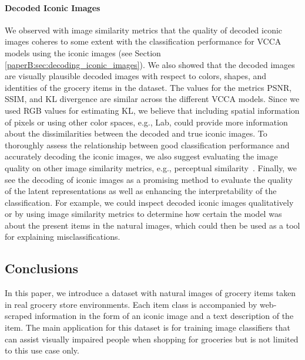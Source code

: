 \vspace{-3mm}
\paragraph{Decoded Iconic Images} %
We observed with image similarity metrics that the quality of decoded iconic images coheres to some extent with the classification performance for VCCA models using the iconic images (see Section \ref{paperB:sec:decoding_iconic_images}). %
We also showed that the decoded images are visually plausible decoded images with respect to colors, shapes, and identities of the grocery items in the dataset. The values for the metrics PSNR, SSIM, and KL divergence are similar across the different VCCA models. Since we used RGB values for estimating KL, we believe that including spatial information of pixels or using other color spaces, e.g., Lab, could provide more information about the dissimilarities between the decoded and true iconic images. To thoroughly assess the relationship between good classification performance and accurately decoding the iconic images, we also suggest evaluating the image quality on other image similarity metrics, e.g., perceptual similarity~. Finally, we see the decoding of iconic images as a promising method to evaluate the quality of the latent representations as well as enhancing the interpretability of the classification. For example, we could inspect decoded iconic images qualitatively or by using image similarity metrics to determine how certain the model was about the present items in the natural images, which could then be used as a tool for explaining misclassifications.

\subsection{Conclusions}
\label{paperB:sec:conclusions}

In this paper, we introduce a dataset with natural images of grocery items taken in real grocery store environments. Each item class is accompanied by web-scraped information in the form of an iconic image and a text description of the item. The main application for this dataset is for training image classifiers that can assist visually impaired people when shopping for groceries but is not limited to this use case only. 

